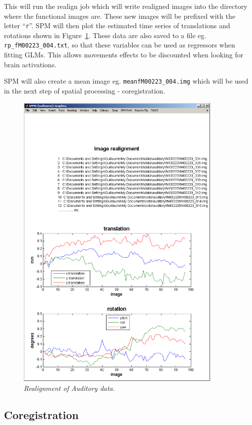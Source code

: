 This will run the realign job which will write realigned images into the directory where the functional images are. These new images will be prefixed with the letter ``\texttt{r}''. SPM will then plot the estimated time series of translations and rotations shown in Figure~\ref{aud_realign}. These data are also saved to a file eg. \texttt{rp\_fM00223\_004.txt}, so that these variables can be used as regressors when fitting GLMs. This allows movements effects to be discounted when looking for brain activations.

SPM will also create a mean image eg. \texttt{meanfM00223\_004.img} which will be used in the next step of spatial processing - coregistration.

\begin{figure}
\begin{center}
\includegraphics[width=100mm]{auditory/realign}
\caption{\em Realignment of Auditory data.\label{aud_realign}}
\end{center}
\end{figure}

\subsection{Coregistration}

